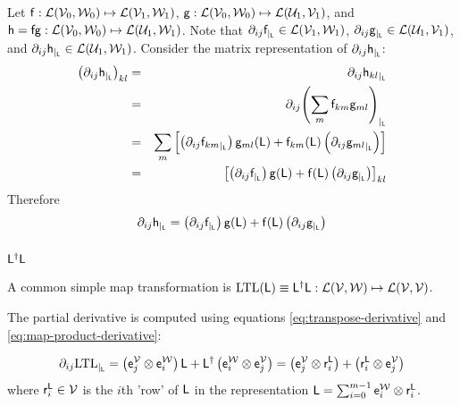 Let
$\mathsf{f} : \mathcal{L}(\mathcal{V}_0,\mathcal{W}_0) \mapsto \mathcal{L}(\mathcal{V}_1,\mathcal{W}_1)$,
$\mathsf{g} : \mathcal{L}(\mathcal{V}_0,\mathcal{W}_0) \mapsto \mathcal{L}(\mathcal{U}_1,\mathcal{V}_1)$,
and
$\mathsf{h} = \mathsf{f}\mathsf{g} : \mathcal{L}(\mathcal{V}_0,\mathcal{W}_0) \mapsto \mathcal{L}(\mathcal{U}_1,\mathcal{W}_1)$.
Note that
${\partial}_{ij}{\mathsf{f}}_{\mid_{\mathsf{L}}} \in  \mathcal{L}(\mathcal{V}_1,\mathcal{W}_1)$,
${\partial}_{ij}{\mathsf{g}}_{\mid_{\mathsf{L}}} \in  \mathcal{L}(\mathcal{U}_1,\mathcal{V}_1)$,
and
${\partial}_{ij}{\mathsf{h}}_{\mid_{\mathsf{L}}} \in  \mathcal{L}(\mathcal{U}_1,\mathcal{W}_1)$.
Consider the matrix representation of ${\partial}_{ij}{\mathsf{h}}_{\mid_{\mathsf{L}}}$:
\begin{eqnarray}
\left( {\partial}_{ij}{\mathsf{h}}_{\mid_{\mathsf{L}}} \right)_{kl}
& = &
{\partial}_{ij}{\mathsf{h}_{kl}}_{\mid_{\mathsf{L}}}
\\
& = &
{\partial}_{ij}{\left( \sum_{m} \mathsf{f}_{km} \mathsf{g}_{ml} \right)}_{\mid_{\mathsf{L}}}
\nonumber
\\
& = &
\sum_{m}  \left[
\left( {\partial}_{ij}{\mathsf{f}_{km}}_{\mid_{\mathsf{L}}} \right) \mathsf{g}_{ml}(\mathsf{L})
+
\mathsf{f}_{km}(\mathsf{L}) \left( {\partial}_{ij}{\mathsf{g}_{ml}}_{\mid_{\mathsf{L}}} \right)
\right]
\nonumber
\\
& = &
\left[
\left( {\partial}_{ij}{\mathsf{f}}_{\mid_{\mathsf{L}}} \right) \mathsf{g}(\mathsf{L})
+
\mathsf{f}(\mathsf{L}) \left( {\partial}_{ij}{\mathsf{g}}_{\mid_{\mathsf{L}}} \right)
\right]_{kl}
\nonumber
\end{eqnarray}
Therefore
\begin{equation}
\label{eq:map-product-derivative}
{\partial}_{ij}{\mathsf{h}}_{\mid_{\mathsf{L}}}
 =
\left( {\partial}_{ij}{\mathsf{f}}_{\mid_{\mathsf{L}}} \right) \mathsf{g}(\mathsf{L})
+
\mathsf{f}(\mathsf{L}) \left( {\partial}_{ij}{\mathsf{g}}_{\mid_{\mathsf{L}}} \right)
\end{equation}


\subsubsection{$\mathsf{L}^{\dagger} \mathsf{L}$}
\label{sec:Derivatives-of-LTL}

A common simple map transformation
is $\mathrm{LTL}(\mathsf{L}) \equiv \mathsf{L}^{\dagger} \mathsf{L}
: \mathcal{L}(\mathcal{V},\mathcal{W}) \mapsto \mathcal{L}(\mathcal{V},\mathcal{V})$.

The partial derivative is computed using equations
\ref{eq:transpose-derivative}
and
\ref{eq:map-product-derivative}:

\begin{equation}
{\partial}_{ij}{\mathrm{LTL}}_{\mid_{\mathsf{L}}}
=
\left( \mathsf{e}_j^{\mathcal{V}} \otimes \mathsf{e}_i^{\mathcal{W}} \right) \mathsf{L}
+
\mathsf{L}^{\dagger} \left( \mathsf{e}_i^{\mathcal{W}} \otimes \mathsf{e}_j^{\mathcal{V}} \right)
=
\left( \mathsf{e}_j^{\mathcal{V}} \otimes \mathsf{r}_i^{\mathsf{L}} \right)
+
\left( \mathsf{r}_i^{\mathsf{L}} \otimes \mathsf{e}_j^{\mathcal{V}} \right)
\end{equation}
where $\mathsf{r}_i^{\mathsf{L}} \in \mathcal{V}$ is the $i$th 'row' of $\mathsf{L}$
in the representation $\mathsf{L} = \sum_{i=0}^{m-1} \mathsf{e}_i^{\mathcal{W}} \otimes \mathsf{r}_i^{\mathsf{L}}$.

